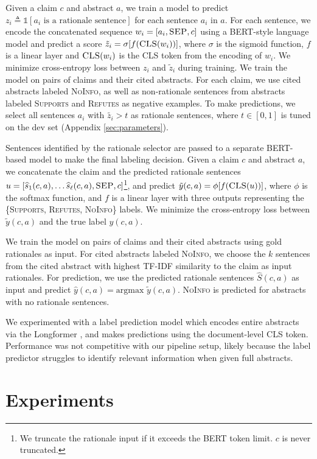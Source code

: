 \documentclass[11pt,a4paper]{article}
\newcommand{\supports}{\textsc{Supports}\xspace}
\newcommand{\refutes}{\textsc{Refutes}\xspace}
\newcommand{\notenough}{\textsc{NoInfo}\xspace}
\newcommand{\bert}{\textsc{BERT}\xspace}
\newcommand{\cls}{\textsc{CLS}\xspace}
\newcommand{\sep}{\textsc{SEP}\xspace}
\newcommand{\Shat}{\widehat{S}}
\newcommand{\shat}{\widehat{s}}
\begin{document}
\vspace{.2cm}  \label{sec:rationale_selection}
Given a claim $c$ and abstract $a$, we train a model to predict $z_i \triangleq \mathds{1}[a_i \textrm{ is a rationale sentence}]$ for each sentence $a_i$ in $a$. For each sentence, we encode the concatenated sequence $w_i = [a_i, \sep, c]$ using a \bert-style language model and predict a score $\tilde{z}_i = \sigma[f(\cls(w_i))]$, where $\sigma$ is the sigmoid function, $f$ is a linear layer and $\cls(w_i)$ is the \cls token from the encoding of $w_i$. We minimize cross-entropy loss between $z_i$ and $\tilde{z}_i$ during training. We train the model on pairs of claims and their cited abstracts. For each claim, we use cited abstracts labeled \notenough, as well as non-rationale sentences from abstracts labeled \supports and \refutes as negative examples. To make predictions, we select all sentences $a_i$ with $\tilde{z_i} > t$ as rationale sentences, where $t \in [0, 1]$ is tuned on the dev set (Appendix \ref{sec:parameters}).





\vspace{.2cm}  \label{sec:entailment}
Sentences identified by the rationale selector are passed to a separate \bert-based model to make the final
labeling decision. Given a claim $c$ and abstract $a$, we concatenate the claim and the predicted rationale sentences $u = [\shat_1(c, a), \dots \shat_{\ell}(c, a), \sep, c]$\footnote{We truncate the rationale input if it exceeds the \bert token limit. $c$ is never truncated.}, and predict $\tilde{y}(c, a) = \phi[f(\cls(u))]$, where $\phi$ is the softmax function, and $f$ is a linear layer with three outputs representing the \{\supports, \refutes, \notenough\} labels. We minimize the cross-entropy loss between $\tilde{y}(c, a)$ and the true label $y(c, a)$.

We train the model on pairs of claims and their cited abstracts using gold rationales as input. For cited abstracts labeled \notenough, we choose the $k$ sentences from the cited abstract with highest TF-IDF similarity to the claim as input rationales. For prediction, we use the predicted rationale sentences $\Shat(c, a)$ as input and predict $\hat{y}(c, a) = \textrm{argmax }\tilde{y}(c, a)$. \notenough is predicted for abstracts with no rationale sentences.

We experimented with a label prediction model which encodes entire abstracts via the Longformer \cite{Beltagy2020LongformerTL}, and makes predictions using the document-level \cls token. Performance was not competitive with our pipeline setup, likely because the label predictor struggles to identify relevant information when given full abstracts. \section{Experiments}
\end{document}
